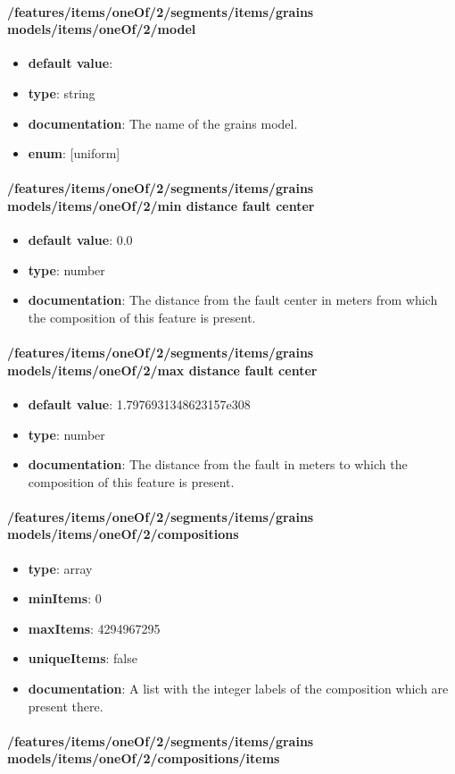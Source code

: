 \paragraph{/features/items/oneOf/2/segments/items/grains models/items/oneOf/2/model}
\begin{itemize}\item {\bf default value}: 
\item {\bf type}: string
\item {\bf documentation}: The name of the grains model.
\item {\bf enum}: [uniform]\end{itemize}\paragraph{/features/items/oneOf/2/segments/items/grains models/items/oneOf/2/min distance fault center}
\begin{itemize}\item {\bf default value}: 0.0
\item {\bf type}: number
\item {\bf documentation}: The distance from the fault center in meters from which the composition of this feature is present.
\end{itemize}\paragraph{/features/items/oneOf/2/segments/items/grains models/items/oneOf/2/max distance fault center}
\begin{itemize}\item {\bf default value}: 1.7976931348623157e308
\item {\bf type}: number
\item {\bf documentation}: The distance from the fault in meters to which the composition of this feature is present.
\end{itemize}\paragraph{/features/items/oneOf/2/segments/items/grains models/items/oneOf/2/compositions}
\begin{itemize}\item {\bf type}: array
\item {\bf minItems}: 0
\item {\bf maxItems}: 4294967295
\item {\bf uniqueItems}: false
\item {\bf documentation}: A list with the integer labels of the composition which are present there.
\end{itemize}\paragraph{/features/items/oneOf/2/segments/items/grains models/items/oneOf/2/compositions/items}
